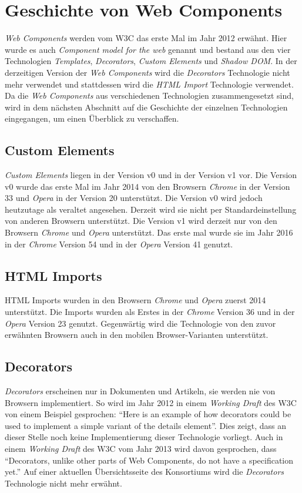 \documentclass[12pt, paper=a4, bibtotoc, toc=listof]{scrreprt}
\begin{document}
		\section{Geschichte von Web Components}
		\emph{Web Components} werden vom \ac{W3C} das erste Mal im Jahr 2012 erwähnt. Hier wurde es auch \emph{Component model for the web} genannt und bestand aus den vier Technologien \emph{Templates}, \emph{Decorators}, \emph{Custom Elements} und \emph{Shadow DOM}. In der derzeitigen Version der \emph{Web Components} wird die \emph{Decorators} Technologie nicht mehr verwendet und stattdessen wird die \emph{\ac{HTML} Import} Technologie verwendet. Da die \emph{Web Components} aus verschiedenen Technologien zusammengesetzt sind, wird in dem nächsten Abschnitt auf die Geschichte der einzelnen Technologien eingegangen, um einen Überblick zu verschaffen.
		\subsection{Custom Elements}
		\emph{Custom Elements} liegen in der Version v0 und in der Version v1 vor. Die Version v0 wurde das erste Mal im Jahr 2014 von den Browsern \emph{Chrome} in der Version 33 und \emph{Opera} in der Version 20 unterstützt. Die Version v0 wird jedoch heutzutage als veraltet angesehen. Derzeit wird sie nicht per Standardeinstellung von anderen Browsern unterstützt. Die Version v1 wird derzeit nur von den Browsern \emph{Chrome} und \emph{Opera} unterstützt. Das erste mal wurde sie im Jahr 2016 in der \emph{Chrome} Version 54 und in der \emph{Opera} Version 41 genutzt. 
		\subsection{HTML Imports}
		HTML Imports wurden in den Browsern \emph{Chrome} und \emph{Opera} zuerst 2014 unterstützt. Die Imports wurden als Erstes in der \emph{Chrome} Version 36 und in der \emph{Opera} Version 23 genutzt. Gegenwärtig wird die Technologie von den zuvor erwähnten Browsern auch in den mobilen Browser-Varianten unterstützt.
		\subsection{Decorators}
		\emph{Decorators} erscheinen nur in Dokumenten und Artikeln, sie werden nie von Browsern implementiert. So wird im Jahr 2012 in einem \emph{Working Draft} des \ac{W3C} von einem Beispiel gesprochen: \enquote{Here is an example of how decorators could be used to implement a simple variant of the details element}. Dies zeigt, dass an dieser Stelle noch keine Implementierung dieser Technologie vorliegt. Auch in einem \emph{Working Draft} des \ac{W3C} vom Jahr 2013 wird davon gesprochen, dass \enquote{Decorators, unlike other parts of Web Components, do not have a specification yet.}
		Auf einer aktuellen Übersichtsseite des Konsortiums wird die \emph{Decorators} Technologie nicht mehr erwähnt.
\end{document}
